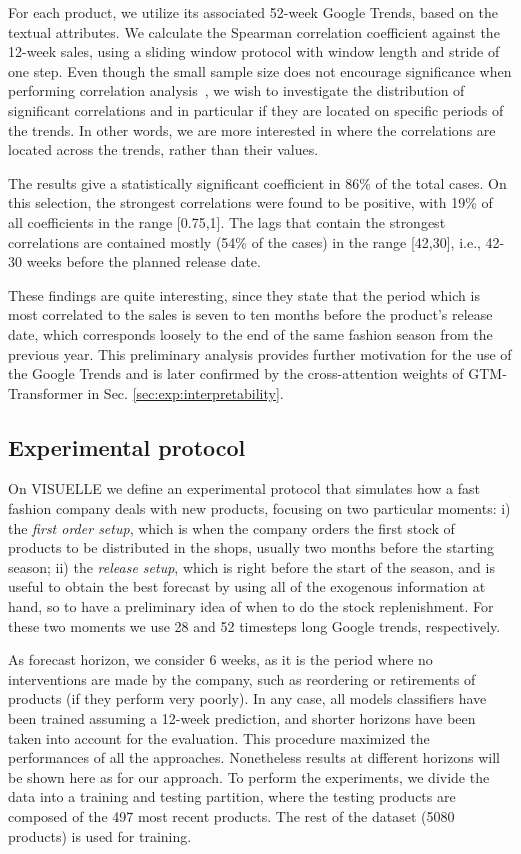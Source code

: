 \documentclass{article}
\newcommand{\datasetname}[0] {VISUELLE}
\newcommand{\approachname}[0] {GTM-Transformer\xspace}
\begin{document}
For each product, we utilize its associated 52-week Google Trends, based on the textual attributes. We calculate the Spearman correlation coefficient against the 12-week sales, using a sliding window protocol with window length  and stride of one step. Even though the small sample size does not encourage significance when performing correlation analysis~\cite{de2016comparing}, we wish to investigate the distribution of significant correlations and in particular if they are located on specific periods of the trends. In other words, we are more interested in where the correlations are located across the trends, rather than their values. 

The results give a statistically significant  coefficient in 86\% of the total cases. On this selection, the strongest correlations were found to be positive, with 19\% of all coefficients in the range [0.75,1]. The lags that contain the strongest correlations are contained mostly (54\% of the cases) in the range [42,30], i.e., 42-30 weeks before the planned release date.

These findings are quite interesting, since they state that the period which is most correlated to the sales is seven to ten months before the product's release date, which corresponds loosely to the end of the same fashion season from the previous year. This preliminary analysis provides further motivation for the use of the Google Trends and is later confirmed by the cross-attention weights of \approachname in Sec. \ref{sec:exp:interpretability}.



\subsection{Experimental protocol}\label{sec:exp:proto}
On \datasetname{} we define an experimental protocol that simulates how a fast fashion company deals with new products, focusing on two particular moments: i) the \emph{first order setup}, which is when the company orders the first stock of products to be distributed in the shops, usually two months before the starting season; ii) the \emph{release setup}, which is right before the start of the season, and is useful to obtain the best forecast by using all of the exogenous information at hand, so to have a preliminary idea of when to do the stock replenishment. For these two moments we use 28 and 52 timesteps long Google trends, respectively.

As forecast horizon, we consider 6  weeks, as it is the period where no interventions are made by the company, such as reordering or retirements of products (if they perform very poorly). In any case, all models classifiers have been trained assuming a 12-week prediction, and shorter horizons have been taken into account for the evaluation. This procedure maximized the performances of all the approaches. Nonetheless results at different horizons will be shown here as for our approach. To perform the experiments, we divide the data into a training and testing partition, where the testing products are composed of the 497 most recent products. The rest of the dataset (5080 products) is used for training. 
\end{document}
